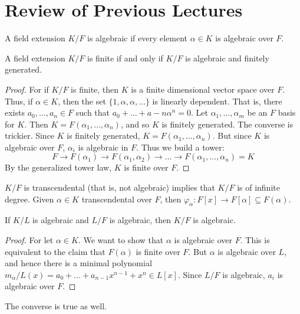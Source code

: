 \documentclass{article}                                                        %
\begin{document}
    \section{Review of Previous Lectures}
        A field extension $K/F$ is algebraic if every element $\alpha\in{K}$ is
        algebraic over $F$.
        \begin{theorem}
            A field extension $K/F$ is finite if and only if $K/F$ is algebraic
            and finitely generated.
        \end{theorem}
        \begin{proof}
            For if $K/F$ is finite, then $K$ is a finite dimensional vector
            space over $F$. Thus, if $\alpha\in{K}$, then the set
            $\{1,\alpha,\alpha,\dots\}$ is linearly dependent. That is, there
            exists $a_{0},\dots,a_{n}\in{F}$ such that
            $a_{0}+\dots+a-{n}\alpha^{n}=0$. Let $\alpha_{1},\dots,\alpha_{m}$
            be an $F$ basis for $K$. Then $K=F(\alpha_{1},\dots,\alpha_{n})$,
            and so $K$ is finitely generated. The converse is trickier. Since
            $K$ is finitely generated, $K=F(\alpha_{1},\dots,\alpha_{n})$. But
            since $K$ is algebraic over $F$, $\alpha_{i}$ is algebraic in $F$.
            Thus we build a tower:
            \begin{equation}
                F\rightarrow{F}(\alpha_{1})\rightarrow{F}(\alpha_{1},\alpha_{2})
                    \rightarrow\dots\rightarrow{F}(\alpha_{1},\dots,\alpha_{n})
                    =K
            \end{equation}
            By the generalized tower law, $K$ is finite over $F$.
        \end{proof}
        $K/F$ is transcendental (that is, not algebraic) implies that $K/F$ is
        of infinite degree. Given $\alpha\in{K}$ transcendental over $F$, then
        $\varphi_{\alpha}:F[x]\rightarrow{F}[\alpha]\subseteq{F}(\alpha)$.
        \begin{theorem}
            If $K/L$ is algebraic and $L/F$ is algebraic, then $K/F$ is
            algebraic.
        \end{theorem}
        \begin{proof}
            For let $\alpha\in{K}$. We want to show that $\alpha$ is algebraic
            over $F$. This is equivalent to the claim that $F(\alpha)$ is finite
            over $F$. But $\alpha$ is algebraic over $L$, and hence there is a
            minimal polynomial
            $m_{\alpha}/L(x)=a_{0}+\dots+a_{n-1}x^{n-1}+x^{n}\in{L}[x]$. Since
            $L/F$ is algebraic, $a_{i}$ is algebraic over $F$.
        \end{proof}
        The converse is true as well.
\end{document}
